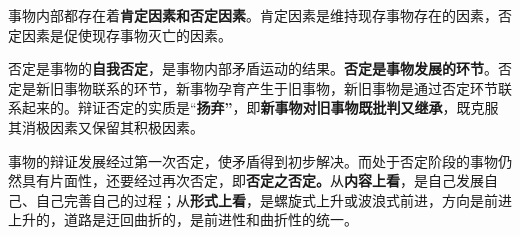 事物内部都存在着\textbf{{肯定因素和否定因素}}。肯定因素是维持现存事物存在的因素，否定因素是促使现存事物灭亡的因素。

否定是事物的\textbf{{自我否定}}，是事物内部矛盾运动的结果。\textbf{{否定是事物发展的环节}}。否定是新旧事物联系的环节，新事物孕育产生于旧事物，新旧事物是通过否定环节联系起来的。辩证否定的实质是{``}\textbf{{扬弃}{''}}，即\textbf{{新事物对旧事物既批判又继承}}，既克服其消极因素又保留其积极因素。

{事物的辩证发展经过第一次否定，使矛盾得到初步解决。而处于否定阶段的事物仍然具有片面性，还要经过再次否定，即}\textbf{{否定之否定}。}{从}\textbf{{内容上看}}{，是自己发展自己、自己完善自己的过程；从}\textbf{{形式上看}}{，是}{螺旋式上升或波浪式前进}{，方向是前进上升的，道路是迂回曲折的，是前进性和曲折性的统一。}
